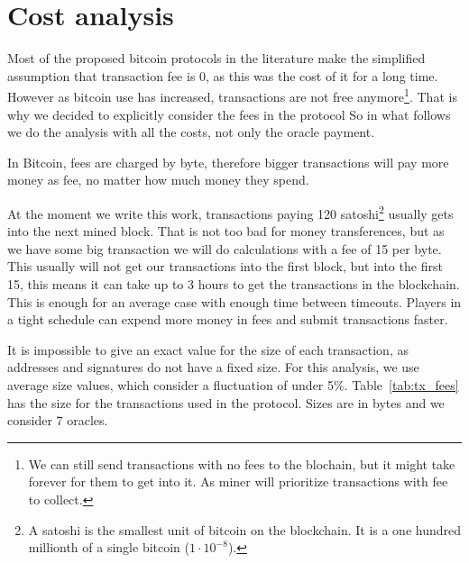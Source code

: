 \section {Cost analysis} \label{sec:cost_analysis}
\newcommand\numoracles[0]{7}%
\newcommand\feeval[0]{15}%
\newcommand\bitcoinusd[0]{3800}%
\newcommand\txcost[2]{\calculatecosts{#1}{#2}{\numoracles{}}{\feeval{}}}%
\newcommand\usdcost[1]{\satoshitousd{#1}{\bitcoinusd{}}}%

Most of the proposed bitcoin protocols in the literature make the simplified
  assumption that transaction fee is 0, as this was the cost of it for a long
  time.
However as bitcoin use has increased, transactions are not free
  anymore\footnote{We can still send transactions with no fees to the blochain,
    but it might take forever for them to get into it. As miner will prioritize
    transactions with fee to collect.}.
That is why we decided to explicitly consider the fees in the protocol
So in what follows we do the analysis with all the costs, not only the oracle
  payment.

In Bitcoin, fees are charged by byte, therefore bigger transactions will pay more
  money as fee, no matter how much money they spend.

At the moment we write this work, transactions paying 120 satoshi\footnote{A
  satoshi is the smallest unit of bitcoin on the blockchain. It is a one hundred
  millionth of a single bitcoin ($1 \cdot 10^{-8}$).} usually gets into the next
  mined block.
That is not too bad for money transferences, but as we have some big transaction
  we will do calculations with a fee of \feeval{} per byte.
This usually will not get our transactions into the first block, but into the
  first 15, this means it can take up to 3 hours to get the transactions in
  the blockchain.
This is enough for an average case with enough time between timeouts.
Players in a tight schedule can expend more money in fees and submit
  transactions faster.

It is impossible to give an exact value for the size of each transaction, as
  addresses and signatures do not have a fixed size.
For this analysis, we use average size values, which consider a fluctuation of
  under 5\%.
Table~\ref{tab:tx_fees} has the size for the transactions used in the protocol.
Sizes are in bytes and we consider \numoracles{} oracles.

